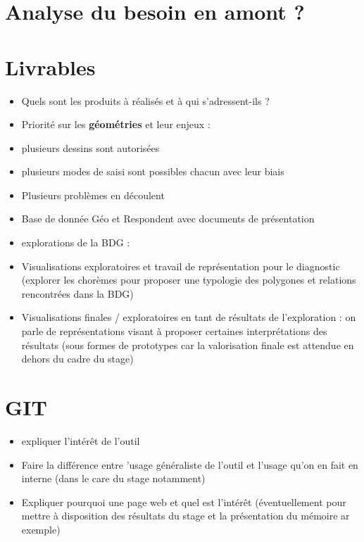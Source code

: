 \documentclass[
  12pt,
  a4paperpaper,
]{book}
\providecommand{\tightlist}{%
  \setlength{\itemsep}{0pt}\setlength{\parskip}{0pt}}\usepackage{longtable,booktabs,array}
\begin{document}
\hypertarget{analyse-du-besoin-en-amont}{%
\section*{Analyse du besoin en amont
?}\label{analyse-du-besoin-en-amont}}

\hypertarget{livrables}{%
\section*{Livrables}\label{livrables}}

\begin{itemize}
\tightlist
\item
  Quels sont les produits à réalisés et à qui s'adressent-ils ?
\item
  Priorité sur les \textbf{géométries} et leur enjeux :
\item
  plusieurs dessins sont autorisées
\item
  plusieurs modes de saisi sont possibles chacun avec leur biais
\item
  Plusieurs problèmes en découlent
\item
  Base de donnée Géo et Respondent avec documents de présentation
\item
  explorations de la BDG :
\item
  Visualisations exploratoires et travail de représentation pour le
  diagnostic (explorer les chorèmes pour proposer une typologie des
  polygones et relations rencontrées dans la BDG)
\item
  Visualisations finales / exploratoires en tant de résultats de
  l'exploration : on parle de représentations visant à proposer
  certaines interprétations des résultats (sous formes de prototypes car
  la valorisation finale est attendue en dehors du cadre du stage)
\end{itemize}

\hypertarget{git}{%
\section*{GIT}\label{git}}

\begin{itemize}
\tightlist
\item
  expliquer l'intérêt de l'outil
\item
  Faire la différence entre 'usage généraliste de l'outil et l'usage
  qu'on en fait en interne (dans le care du stage notamment)
\item
  Expliquer pourquoi une page web et quel est l'intérêt (éventuellement
  pour mettre à disposition des résultats du stage et la présentation du
  mémoire ar exemple)
\end{itemize}
\end{document}
